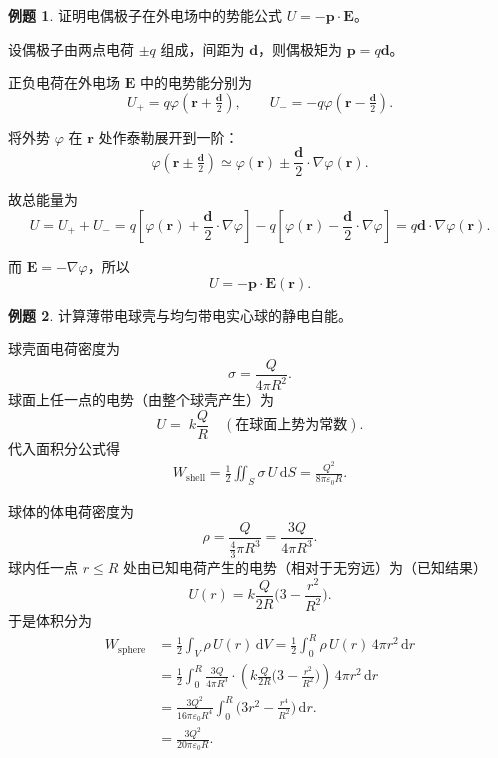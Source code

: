 \documentclass[12pt,a4paper,oneside]{report}
\theoremstyle{definition}
\newtheorem{example}{例题}[chapter]
\theoremstyle{remark}
\begin{document}
\begin{example}
证明电偶极子在外电场中的势能公式 \(U=-\mathbf{p}\cdot\mathbf{E}\)。

设偶极子由两点电荷 \(\pm q\) 组成，间距为 \(\mathbf{d}\)，则偶极矩为
\(\mathbf{p}=q\mathbf{d}\)。

正负电荷在外电场 \(\mathbf{E}\) 中的电势能分别为
\[
U_{+}=q\varphi(\mathbf{r}+\tfrac{\mathbf{d}}{2}),\qquad
U_{-}=-q\varphi(\mathbf{r}-\tfrac{\mathbf{d}}{2}).
\]

将外势 \(\varphi\) 在 \(\mathbf{r}\) 处作泰勒展开到一阶：
\[
\varphi(\mathbf{r}\pm\tfrac{\mathbf{d}}{2})
\simeq \varphi(\mathbf{r})\pm \frac{\mathbf{d}}{2}\cdot\nabla\varphi(\mathbf{r}).
\]

故总能量为
\[
U=U_{+}+U_{-}
= q\left[\varphi(\mathbf{r})+\frac{\mathbf{d}}{2}\cdot\nabla\varphi\right]
-q\left[\varphi(\mathbf{r})-\frac{\mathbf{d}}{2}\cdot\nabla\varphi\right]
= q\mathbf{d}\cdot\nabla\varphi(\mathbf{r}).
\]

而 \(\mathbf{E}=-\nabla\varphi\)，所以
\[
\boxed{U=-\mathbf{p}\cdot\mathbf{E}(\mathbf{r})}.
\]
\end{example}


\begin{example}
计算薄带电球壳与均匀带电实心球的静电自能。

球壳面电荷密度为
\[
\sigma=\frac{Q}{4\pi R^2}.
\]
球面上任一点的电势（由整个球壳产生）为
\[
U=\;k\frac{Q}{R}\quad(\text{在球面上势为常数}).
\]
代入面积分公式得
\[
\begin{aligned}
W_{\mathrm{shell}}=\tfrac{1}{2}\iint_{S}\sigma\,U\,\mathrm{d}S
= \frac{Q^2}{8\pi\varepsilon_0 R}.
\end{aligned}
\]
\end{example}

球体的体电荷密度为
\[
\rho=\frac{Q}{\tfrac{4}{3}\pi R^3}=\frac{3Q}{4\pi R^3}.
\]
球内任一点 \(r\le R\) 处由已知电荷产生的电势（相对于无穷远）为（已知结果）
\[
U(r)=k\frac{Q}{2R}\Big(3-\frac{r^2}{R^2}\Big).
\]
于是体积分为
\[
\begin{aligned}
W_{\mathrm{sphere}}
&=\tfrac{1}{2}\int_{V}\rho\,U(r)\,\mathrm{d}V
=\tfrac{1}{2}\int_{0}^{R}\rho\,U(r)\,4\pi r^2\,\mathrm{d}r \\
&=\tfrac{1}{2}\int_{0}^{R}\frac{3Q}{4\pi R^3}\cdot
\left(k\frac{Q}{2R}\Big(3-\frac{r^2}{R^2}\Big)\right)\,4\pi r^2\,\mathrm{d}r \\
&= \frac{3Q^2}{16\pi\varepsilon_0R^4}
\int_{0}^{R}\big(3r^2-\frac{r^4}{R^2}\big)\,\mathrm{d}r. \\
&= \frac{3Q^2}{20\pi\varepsilon_0 R}.
\end{aligned}
\]
\end{document}

